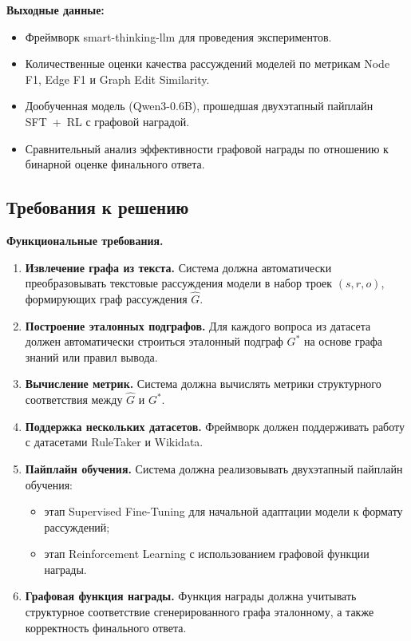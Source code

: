 \textbf{Выходные данные:}
\begin{itemize}
    \item Фреймворк smart-thinking-llm для проведения экспериментов.
    \item Количественные оценки качества рассуждений моделей по метрикам Node F1, Edge F1 и Graph Edit Similarity.
    \item Дообученная модель (Qwen3-0.6B), прошедшая двухэтапный пайплайн SFT~+~RL с графовой наградой.
    \item Сравнительный анализ эффективности графовой награды по отношению к бинарной оценке финального ответа.
\end{itemize}

\subsection{Требования к решению}
\label{subsec:requirements}

\textbf{Функциональные требования.}

\begin{enumerate}
    \item \textbf{Извлечение графа из текста.} Система должна автоматически преобразовывать текстовые рассуждения модели в набор троек $(s, r, o)$, формирующих граф рассуждения $\hat{G}$.
    \item \textbf{Построение эталонных подграфов.} Для каждого вопроса из датасета должен автоматически строиться эталонный подграф $G^*$ на основе графа знаний или правил вывода.
    \item \textbf{Вычисление метрик.} Система должна вычислять метрики структурного соответствия между $\hat{G}$ и $G^*$.
    \item \textbf{Поддержка нескольких датасетов.} Фреймворк должен поддерживать работу с датасетами RuleTaker и Wikidata.
    \item \textbf{Пайплайн обучения.} Система должна реализовывать двухэтапный пайплайн обучения:
    \begin{itemize}
        \item этап Supervised Fine-Tuning для начальной адаптации модели к формату рассуждений;
        \item этап Reinforcement Learning с использованием графовой функции награды.
    \end{itemize}
    \item \textbf{Графовая функция награды.} Функция награды должна учитывать структурное соответствие сгенерированного графа эталонному, а также корректность финального ответа.
\end{enumerate}

